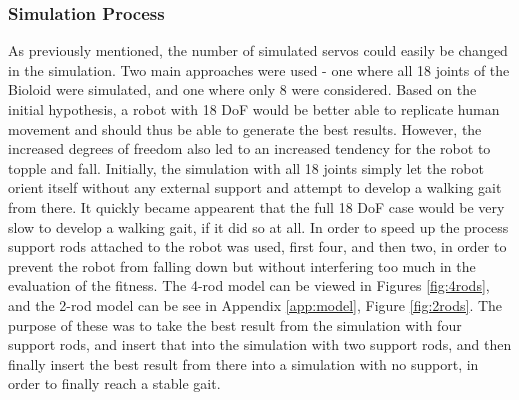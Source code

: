 \subsubsection{Simulation Process}

As previously mentioned, the number of simulated servos could easily be changed in the simulation. Two main approaches were used - one where all 18 joints of the Bioloid were simulated, and one where only 8 were considered. Based on the initial hypothesis, a robot with 18 DoF would be better able to replicate human movement and should thus be able to generate the best results. However, the increased degrees of freedom also led to an increased tendency for the robot to topple and fall. Initially, the simulation with all 18 joints simply let the robot orient itself without any external support and attempt to develop a walking gait from there. It quickly became appearent that the full 18 DoF case would be very slow to develop a walking gait, if it did so at all. In order to speed up the process support rods attached to the robot was used, first four, and then two, in order to prevent the robot from falling down but without interfering too much in the evaluation of the fitness. The 4-rod model can be viewed in Figures \ref{fig:4rods}, and the 2-rod model can be see in Appendix \ref{app:model}, Figure \ref{fig:2rods}. The purpose of these was to take the best result from the simulation with four support rods, and insert that into the simulation with two support rods, and then finally insert the best result from there into a simulation with no support, in order to finally reach a stable gait. 

